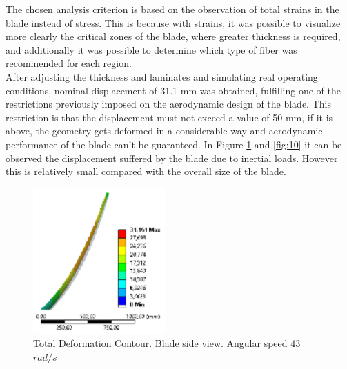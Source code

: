 The chosen analysis criterion is based on the observation of total strains in the blade instead of stress. This is because with strains, it was possible to visualize more clearly the critical zones of the blade, where greater thickness is required, and additionally it was possible to determine which type of fiber was recommended for each region.\\

After adjusting the thickness and laminates and simulating real operating conditions, nominal displacement of 31.1 mm was obtained, fulfilling one of the restrictions previously imposed on the aerodynamic design of the blade. This restriction is that the displacement must not exceed a value of 50 mm, if it is above, the geometry gets deformed in a considerable way and aerodynamic performance of the blade can’t be guaranteed. In Figure \ref{fig:9} and \ref{fig:10} it can be observed the displacement suffered by the blade due to inertial loads. However this is relatively small compared with the overall size of the blade.


\begin{figure}[H]
\begin{center}
  \includegraphics[width=0.45\textwidth]{p2}
\caption{Total Deformation Contour. Blade side view. Angular speed 43 $rad/s$}
\label{fig:9}       %
\end{center}
\end{figure}

